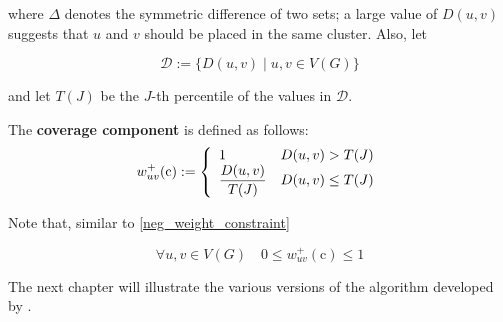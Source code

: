 where $\Delta$ denotes the symmetric difference of two sets; a large value of $D(u, v)$ suggests that $u$ and $v$ should be placed in the same cluster. Also, let

\begin{equation}
    \mathscr{D} := \{D(u, v) \mid u, v \in V(G)\}
\end{equation}

and let $T(J)$ be the $J$-th percentile of the values in $\mathscr{D}$.

\begin{definition} \label{co_comp}
    The \textbf{coverage component} is defined as follows: $$w_{uv}^+(\mathrm c) := \soe{ll}{1 & D(u, v) > T(J) \\ \dfrac{D(u, v)}{T(J)} & D(u, v) \le T(J)}$$
\end{definition}

Note that, similar to \cref{neg_weight_constraint}

\begin{equation}
    \forall u, v \in V(G) \quad 0 \le w_{uv}^+(\mathrm c) \le 1
\end{equation}

The next chapter will illustrate the various versions of the algorithm developed by \textcite{c3}.

\cleardoublepage
